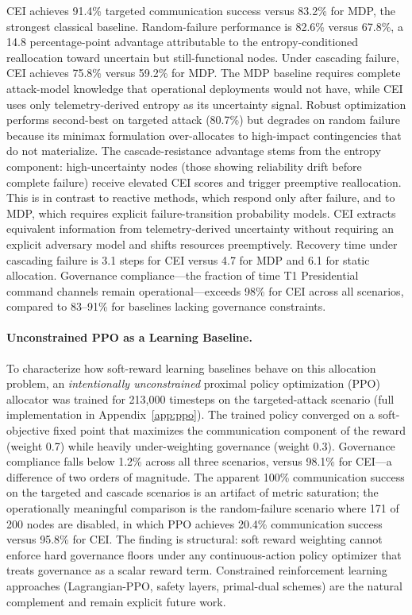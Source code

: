\documentclass[runningheads]{llncs}
\begin{document}
CEI achieves 91.4\% targeted communication success versus 83.2\% for MDP, the strongest classical baseline. Random-failure performance is 82.6\% versus 67.8\%, a 14.8 percentage-point advantage attributable to the entropy-conditioned reallocation toward uncertain but still-functional nodes. Under cascading failure, CEI achieves 75.8\% versus 59.2\% for MDP. The MDP baseline requires complete attack-model knowledge that operational deployments would not have, while CEI uses only telemetry-derived entropy as its uncertainty signal. Robust optimization performs second-best on targeted attack (80.7\%) but degrades on random failure because its minimax formulation over-allocates to high-impact contingencies that do not materialize. The cascade-resistance advantage stems from the entropy component: high-uncertainty nodes (those showing reliability drift before complete failure) receive elevated CEI scores and trigger preemptive reallocation. This is in contrast to reactive methods, which respond only after failure, and to MDP, which requires explicit failure-transition probability models. CEI extracts equivalent information from telemetry-derived uncertainty without requiring an explicit adversary model and shifts resources preemptively. Recovery time under cascading failure is 3.1 steps for CEI versus 4.7 for MDP and 6.1 for static allocation. Governance compliance---the fraction of time T1 Presidential command channels remain operational---exceeds 98\% for CEI across all scenarios, compared to 83--91\% for baselines lacking governance constraints.

\paragraph{Unconstrained PPO as a Learning Baseline.} To characterize how soft-reward learning baselines behave on this allocation problem, an \emph{intentionally unconstrained} proximal policy optimization (PPO) allocator was trained for 213{,}000 timesteps on the targeted-attack scenario (full implementation in Appendix~\ref{app:ppo}). The trained policy converged on a soft-objective fixed point that maximizes the communication component of the reward (weight 0.7) while heavily under-weighting governance (weight 0.3). Governance compliance falls below 1.2\% across all three scenarios, versus 98.1\% for CEI---a difference of two orders of magnitude. The apparent 100\% communication success on the targeted and cascade scenarios is an artifact of metric saturation; the operationally meaningful comparison is the random-failure scenario where 171 of 200 nodes are disabled, in which PPO achieves 20.4\% communication success versus 95.8\% for CEI. The finding is structural: soft reward weighting cannot enforce hard governance floors under any continuous-action policy optimizer that treats governance as a scalar reward term. Constrained reinforcement learning approaches (Lagrangian-PPO, safety layers, primal-dual schemes) are the natural complement and remain explicit future work.
\end{document}
